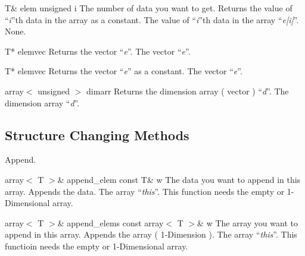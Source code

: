 \setConstInstance
\printMethodWithOneParam
{T\&}
{elem}
{unsigned}
{i}
{The number of data you want to get.}
{Returns the value of ``{\em i}''th data in the array as a constant.}
{The value of ``{\em i}''th data in the array ``{\em e[i]}''.}
{None.}

\setNormalInstance
\printEmptyMethodReturn
{T*}
{elemvec}
{Returns the vector ``{\em e}''.}
{The vector ``{\em e}''.}

\setConstInstance
\printEmptyMethodReturn
{T*}
{elemvec}
{Returns the vector ``{\em e}'' as a constant.}
{The vector ``{\em e}''.}

\setConstInstance
\printEmptyMethodReturn
{array$<$ unsigned $>$}
{dimarr}
{Returns the dimension array ( vector ) ``{\em d}''.}
{The dimension array ``{\em d}''.}

\clearpage

\subsection{Structure Changing Methods}

\vspace*{5mm}

\noindent
Append.

\setNormalInstance
\printMethodWithOneParam
{array$<$ T $>$\&}
{append\_elem}
{const T\&}
{w}
{The data you want to append in this array.}
{Appends the data.}
{The array ``{\em this}''.}
{This function needs the empty or 1-Dimensional array.}

\setNormalInstance
\printMethodWithOneParam
{array$<$ T $>$\&}
{append\_elems}
{const array$<$ T $>$\&}
{w}
{The array you want to append in this array.}
{Appends the array ( 1-Dimension ).}
{The array ``{\em this}''.}
{This functioin needs the empty or 1-Dimensional array.}

